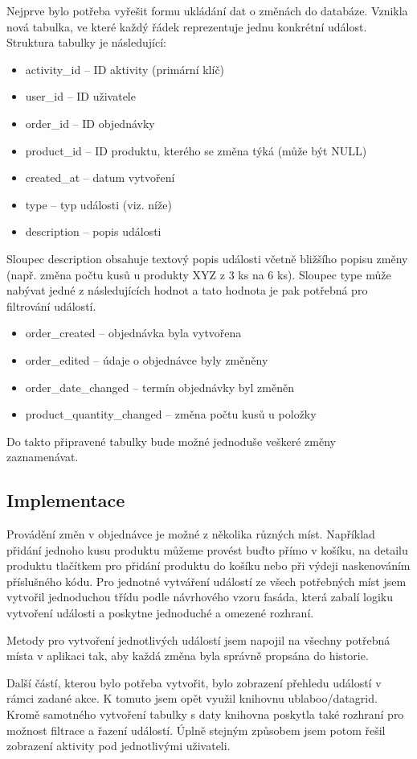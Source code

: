 Nejprve bylo potřeba vyřešit formu ukládání dat o změnách do databáze. Vznikla nová tabulka, ve které každý řádek reprezentuje jednu konkrétní událost. Struktura tabulky je následující:

\begin{itemize}
    \item activity\_id -- ID aktivity (primární klíč)
    \item user\_id -- ID uživatele
    \item order\_id -- ID objednávky
    \item product\_id -- ID produktu, kterého se změna týká (může být NULL)
    \item created\_at -- datum vytvoření
    \item type -- typ události (viz. níže)
    \item description -- popis události
\end{itemize}

Sloupec description obsahuje textový popis události včetně bližšího popisu změny (např. změna počtu kusů u produkty XYZ z 3 ks na 6 ks). Sloupec type může nabývat jedné z následujících hodnot a tato hodnota je pak potřebná pro filtrování událostí.

\begin{itemize}
    \item order\_created -- objednávka byla vytvořena
    \item order\_edited -- údaje o objednávce byly změněny
    \item order\_date\_changed -- termín objednávky byl změněn
    \item product\_quantity\_changed -- změna počtu kusů u položky
\end{itemize}

Do takto připravené tabulky bude možné jednoduše veškeré změny zaznamenávat.

\subsection{Implementace}

Provádění změn v objednávce je možné z několika různých míst. Například přidání jednoho kusu produktu můžeme provést buďto přímo v košíku, na detailu produktu tlačítkem pro přidání produktu do košíku nebo při výdeji naskenováním příslušného kódu. Pro jednotné vytváření událostí ze všech potřebných míst jsem vytvořil jednoduchou třídu podle návrhového vzoru fasáda, která zabalí logiku vytvoření události a poskytne jednoduché a omezené rozhraní. \cite{refactoringFacadeDesign}

Metody pro vytvoření jednotlivých událostí jsem napojil na všechny potřebná místa v aplikaci tak, aby každá změna byla správně propsána do historie.

Další částí, kterou bylo potřeba vytvořit, bylo zobrazení přehledu událostí v rámci zadané akce. K tomuto jsem opět využil knihovnu ublaboo/datagrid. \cite{contributteContributteDatagrid} Kromě samotného vytvoření tabulky s daty knihovna poskytla také rozhraní pro možnost filtrace a řazení událostí. Úplně stejným způsobem jsem potom řešil zobrazení aktivity pod jednotlivými uživateli. 
